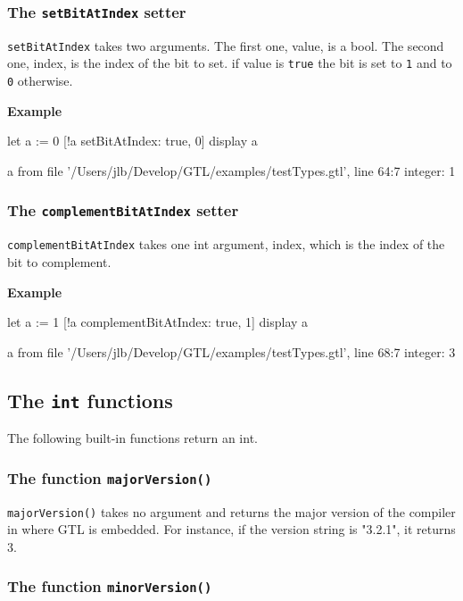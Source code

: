 \documentclass[10pt,openright,twosides,final]{memoir}
\newcommand{\icst}[1]{{\footnotesize\ttfamily\colorbox{light-blue}{#1}}}
\newcommand{\scst}[1]{{\footnotesize\ttfamily\colorbox{light-blue}{"#1"}}}
\newcommand{\gtlarg}[1]{{\footnotesize\ttfamily\colorbox{light-blue}{#1}}}
\newcommand{\gtlinline}[1]{\colorbox{light-blue}{\lstinline[language=gtl]{#1}}}
\newcommand{\example}{\vspace{.75em}\noindent\textbf{Example}\vspace{0em}}
\begin{document}
\subsubsection{The \texttt{setBitAtIndex} setter}

\gtlinline{setBitAtIndex} takes two arguments. The first one, \gtlarg{value}, is a bool. The second one, \gtlarg{index}, is the index of the bit to set. if \gtlarg{value} is \gtlinline{true} the bit is set to \gtlinline{1} and to \gtlinline{0} otherwise.

\example
\begin{gtl}
let a := 0
[!a setBitAtIndex: true, 0]
display a
\end{gtl}
\begin{console}
a from file '/Users/jlb/Develop/GTL/examples/testTypes.gtl', line 64:7
    integer: 1
\end{console}

\subsubsection{The \texttt{complementBitAtIndex} setter}

\gtlinline{complementBitAtIndex} takes one int argument, \gtlarg{index}, which is the index of the bit to complement. 

\example
\begin{gtl}
let a := 1
[!a complementBitAtIndex: true, 1]
display a
\end{gtl}
\begin{console}
a from file '/Users/jlb/Develop/GTL/examples/testTypes.gtl', line 68:7
    integer: 3
\end{console}

\subsection{The \texttt{int} functions}

The following built-in functions return an int.

\subsubsection{The function \texttt{majorVersion()}}

\gtlinline{majorVersion()} takes no argument and returns the major version of the compiler in where GTL is embedded. For instance, if the version string is \scst{3.2.1}, it returns \icst{3}.

\subsubsection{The function \texttt{minorVersion()}}
\end{document}
